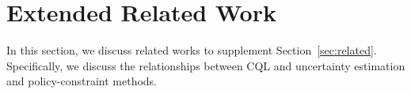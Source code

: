 


\section{Extended Related Work}
\label{sec:extended_related_work}

In this section, we discuss related works to supplement Section~\ref{sec:related}. Specifically, we discuss the relationships between CQL and uncertainty estimation and policy-constraint methods.


